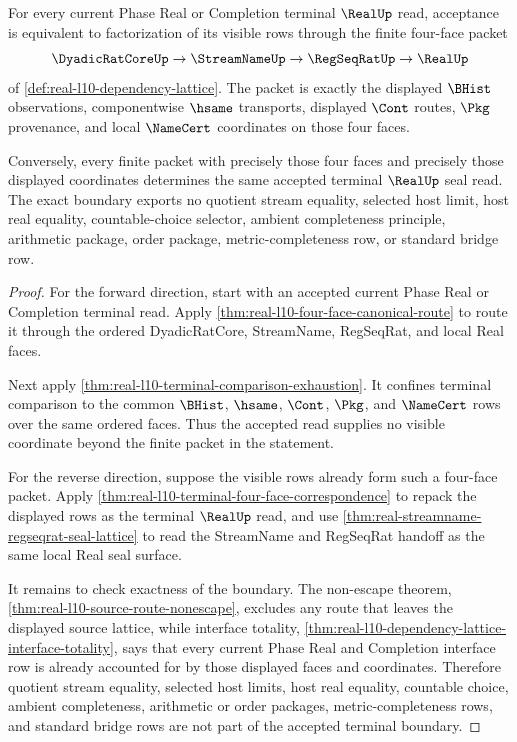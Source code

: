 \begin{theorem}
\label{thm:real-l10-four-face-exactness}
For every current Phase Real or Completion terminal $\RealUp$ read, acceptance is equivalent to factorization of its visible rows through the finite four-face packet
$$
\DyadicRatCoreUp \to \StreamNameUp \to \RegSeqRatUp \to \RealUp
$$
of \autoref{def:real-l10-dependency-lattice}. The packet is exactly the displayed $\BHist$ observations, componentwise $\hsame$ transports, displayed $\Cont$ routes, $\Pkg$ provenance, and local $\NameCert$ coordinates on those four faces.

Conversely, every finite packet with precisely those four faces and precisely those displayed coordinates determines the same accepted terminal $\RealUp$ seal read. The exact boundary exports no quotient stream equality, selected host limit, host real equality, countable-choice selector, ambient completeness principle, arithmetic package, order package, metric-completeness row, or standard bridge row.
\end{theorem}
\begin{proof}
For the forward direction, start with an accepted current Phase Real or Completion terminal read. Apply \autoref{thm:real-l10-four-face-canonical-route} to route it through the ordered DyadicRatCore, StreamName, RegSeqRat, and local Real faces.

Next apply \autoref{thm:real-l10-terminal-comparison-exhaustion}. It confines terminal comparison to the common $\BHist$, $\hsame$, $\Cont$, $\Pkg$, and $\NameCert$ rows over the same ordered faces. Thus the accepted read supplies no visible coordinate beyond the finite packet in the statement.

For the reverse direction, suppose the visible rows already form such a four-face packet. Apply \autoref{thm:real-l10-terminal-four-face-correspondence} to repack the displayed rows as the terminal $\RealUp$ read, and use \autoref{thm:real-streamname-regseqrat-seal-lattice} to read the StreamName and RegSeqRat handoff as the same local Real seal surface.

It remains to check exactness of the boundary. The non-escape theorem, \autoref{thm:real-l10-source-route-nonescape}, excludes any route that leaves the displayed source lattice, while interface totality, \autoref{thm:real-l10-dependency-lattice-interface-totality}, says that every current Phase Real and Completion interface row is already accounted for by those displayed faces and coordinates. Therefore quotient stream equality, selected host limits, host real equality, countable choice, ambient completeness, arithmetic or order packages, metric-completeness rows, and standard bridge rows are not part of the accepted terminal boundary.
\end{proof}


